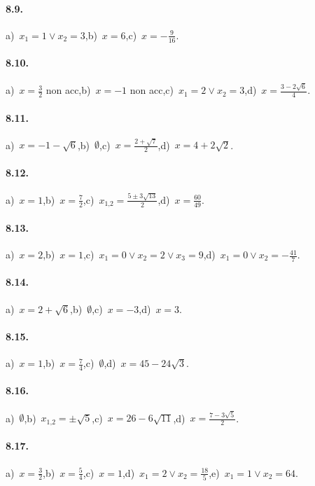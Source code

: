 \begin{multicols}{2}
\paragraph{8.9.} a)~$x_1=1\vee x_2=3$,\quad b)~$x=6$,\quad c)~$x=-\frac 9{16}$.

\paragraph{8.10.} a)~$x=\frac 3 2$ non acc,\quad b)~$x=-1$ non acc,\quad c)~$x_1=2\vee x_2=3$,\quad d)~$x=\frac{3-2\sqrt 6} 4$.

\paragraph{8.11.} a)~$x=-1-\sqrt 6$,\quad b)~$\emptyset $,\quad c)~$x=\frac{2+\sqrt 7} 2$,\quad d)~$x=4+2\sqrt 2$.

\paragraph{8.12.} a)~$x=1$,\quad b)~$x=\frac 7 2$,\quad c)~$x_{1\text{,}2}=\frac{5\pm 3\sqrt{13}} 2$,\quad d)~$x=\frac{60}{49}$.

\paragraph{8.13.} a)~$x=2$,\quad b)~$x=1$,\quad c)~$x_1=0\vee x_2=2\vee x_3=9$,\quad d)~$x_1=0\vee x_2=-\frac{41} 7$.

\paragraph{8.14.} a)~$x=2+\sqrt 6$,\quad b)~$\emptyset $,\quad c)~$x=-3$,\quad d)~$x=3$.

\paragraph{8.15.} a)~$x=1$,\quad b)~$x=\frac{7}{4}$,\quad c)~$\emptyset$,\quad d)~$x=45-24\sqrt{3}$.

\paragraph{8.16.} a)~$\emptyset $,\quad b)~$x_{1\text{,}2}=\pm \sqrt 5$,\quad c)~$x=26-6\sqrt{11}$,\quad d)~$x=\frac{7-3\sqrt 5} 2$.

\paragraph{8.17.} a)~$x=\frac 3 2$,\quad b)~$x=\frac 5 4$,\quad c)~$x=1$,\quad d)~$x_1=2\vee x_2=\frac{18} 5$,\quad e)~$x_1=1\vee x_2=64$.


\end{multicols}
